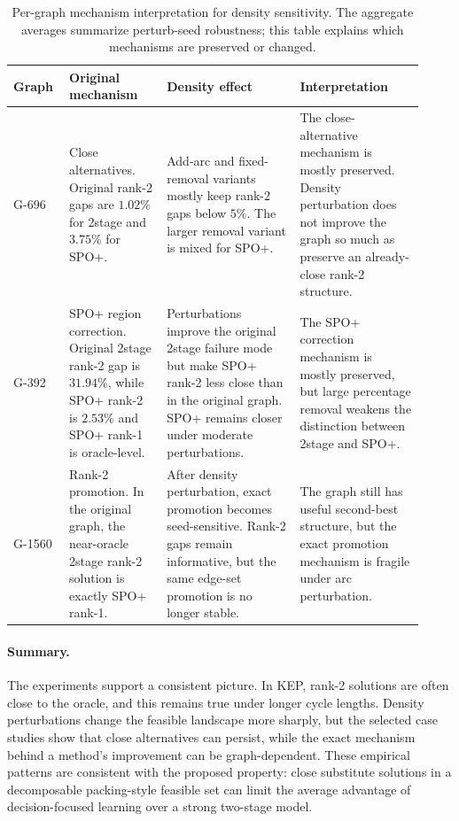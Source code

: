 \begin{table}[t]
\centering
\small
\begin{tabular}{@{}>{\raggedright\arraybackslash}p{0.11\linewidth}
                >{\raggedright\arraybackslash}p{0.22\linewidth}
                >{\raggedright\arraybackslash}p{0.30\linewidth}
                >{\raggedright\arraybackslash}p{0.29\linewidth}@{}}
\toprule
Graph & Original mechanism & Density effect & Interpretation \\
\midrule
G-696 &
Close alternatives. Original rank-2 gaps are $1.02\%$ for 2stage and
$3.75\%$ for SPO+. &
Add-arc and fixed-removal variants mostly keep rank-2 gaps below $5\%$.
The larger removal variant is mixed for SPO+. &
The close-alternative mechanism is mostly preserved. Density perturbation does
not improve the graph so much as preserve an already-close rank-2 structure. \\
\midrule
G-392 &
SPO+ region correction. Original 2stage rank-2 gap is $31.94\%$, while
SPO+ rank-2 is $2.53\%$ and SPO+ rank-1 is oracle-level. &
Perturbations improve the original 2stage failure mode but make SPO+ rank-2
less close than in the original graph. SPO+ remains closer under moderate
perturbations. &
The SPO+ correction mechanism is mostly preserved, but large percentage removal
weakens the distinction between 2stage and SPO+. \\
\midrule
G-1560 &
Rank-2 promotion. In the original graph, the near-oracle 2stage rank-2 solution
is exactly SPO+ rank-1. &
After density perturbation, exact promotion becomes seed-sensitive. Rank-2 gaps
remain informative, but the same edge-set promotion is no longer stable. &
The graph still has useful second-best structure, but the exact promotion
mechanism is fragile under arc perturbation. \\
\bottomrule
\end{tabular}
\caption{Per-graph mechanism interpretation for density sensitivity. The
aggregate averages summarize perturb-seed robustness; this table explains which
mechanisms are preserved or changed.}
\label{tab:case-mechanisms}
\end{table}

\paragraph{Summary.}
The experiments support a consistent picture. In KEP, rank-2 solutions are often
close to the oracle, and this remains true under longer cycle lengths. Density
perturbations change the feasible landscape more sharply, but the selected
case studies show that close alternatives can persist, while the exact mechanism
behind a method's improvement can be graph-dependent. These empirical patterns
are consistent with the proposed property: close substitute solutions in a
decomposable packing-style feasible set can limit the average advantage of
decision-focused learning over a strong two-stage model.
